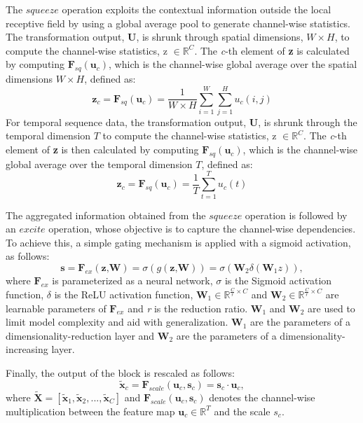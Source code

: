\documentclass[preprint,12pt,3p]{elsarticle}
\begin{document}
The $squeeze$ operation exploits the contextual information outside the local receptive field by using a global average pool to generate channel-wise statistics. The transformation output, \textbf{U}, is shrunk through spatial dimensions, $W \times  H$, to compute the channel-wise statistics, z $\in \mathbb{R}^C$. The \textit{c}-th element of \textbf{z} is calculated by computing $\mathbf F_{sq}(\mathbf u_c)$, which is the channel-wise global average over the spatial dimensions $W \times H$, defined as:
\begin{equation}
    \textbf{z}_c = \textbf{F}_{sq}(\textbf{u}_c)=\frac{1}{W \times H} \sum_{i=1}^{W} \sum_{j=1}^{H} u_c(i,j)
\end{equation}
For temporal sequence data, the transformation output, \textbf{U}, is shrunk through the temporal dimension $T$ to compute the channel-wise statistics, z $\in \mathbb{R}^C$. The \textit{c}-th element of  \textbf{z} is then calculated by computing $\mathbf F_{sq}(\mathbf u_c)$, which is the channel-wise global average over the temporal dimension $T$, defined as:
\begin{equation}
    \textbf{z}_c = \textbf{F}_{sq}(\textbf{u}_c)=\frac{1}{T} \sum_{t=1}^{T} u_c(t)
\end{equation}

The aggregated information obtained from the $squeeze$ operation is followed by an $excite$ operation, whose objective is to capture the channel-wise dependencies. To achieve this, a simple gating mechanism is applied with a sigmoid activation, as follows:
\begin{equation}
    \textbf{s} = \textbf{F}_{ex} (\textbf{z,W}) = \sigma (g(\textbf{z,W})) = \sigma (\textbf{W}_2 \delta (\textbf{W}_1 z)),
\end{equation}
where $\mathbf F_{ex}$ is parameterized as a neural network, $\sigma$ is the Sigmoid activation function, $\delta$ is the ReLU activation function, $\textbf{W}_1 \in \mathbb{R}^{\frac{C}{r}\times C}$ and $\textbf{W}_2 \in \mathbb{R}^{\frac{C}{r}\times C}$ are learnable parameters of $\mathbf F_{ex}$ and \textit{r} is the reduction ratio. $\textbf{W}_1$ and $\textbf{W}_2$  are used to limit model complexity and aid with generalization. $\textbf{W}_1$ are the parameters of a dimensionality-reduction layer and $\textbf{W}_2$ are the parameters of a dimensionality-increasing layer. 

Finally, the output of the block is rescaled as follows:
\begin{equation}
\widetilde{\textbf{x}}_c = \textbf{F}_{scale} (\textbf{u}_c, \textbf{s}_c) = \textbf{s}_c \cdot \textbf{u}_c,  
\end{equation}
where $\widetilde{\textbf{X}} = [\widetilde{\textbf{x}}_1, \widetilde{\textbf{x}}_2, ... , \widetilde{\textbf{x}}_C]$ and $\textbf{F}_{scale}(\textbf{u}_c, \textbf{s}_c)$ denotes the channel-wise multiplication between the feature map $\textbf{u}_c \in \mathbb{R}^{T}$ and the scale $s_c$.
\end{document}
